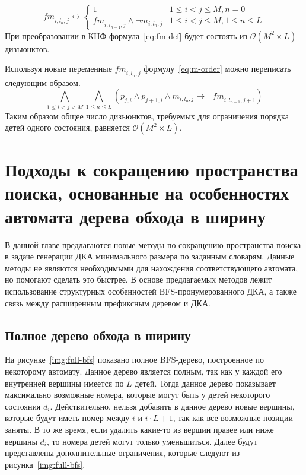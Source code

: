 \begin{equation}
\label{eq:fm-def}
  \mathit{fm}_{i,l_{n},j} \leftrightarrow 
    \begin{cases} 
      1                               & 1 \leq i < j \leq M, n = 0 \\
      \mathit{fm}_{i,l_{n - 1},j} \wedge \neg m_{i,l_{n},j}  & 1 \leq i < j \leq M, 1 \leq n \leq L
    \end{cases} 
\end{equation}
%
При преобразовании в КНФ формула~\eqref{eq:fm-def} будет состоять из $\mathcal{O}\left(M^{2} \times L\right)$ дизъюнктов.

Используя новые переменные $\mathit{fm}_{i,l_{n},j}$ формулу~\eqref{eq:m-order} можно переписать следующим образом.
%
\begin{equation}
\label{eq:m-order-tight}
  \bigwedge_{1 \leq i < j < M} \bigwedge_{1 \leq n \leq L} \left(p_{j,i} \wedge p_{j + 1, i} \wedge m_{i,l_{n}, j} \rightarrow \neg \mathit{fm}_{i, l_{n - 1}, j + 1}\right)
\end{equation}
%
Таким образом общее число дизъюнктов, требуемых для ограничения порядка детей одного состояния, равняется $\mathcal{O}\left(M^{2} \times L\right)$. 


\section{Подходы к сокращению пространства поиска, основанные на особенностях автомата дерева обхода в ширину} 
\label{sec:space:pruning}

В данной главе предлагаются новые методы по сокращению пространства поиска в задаче генерации ДКА минимального размера по заданным словарям. 
Данные методы не являются необходимыми для нахождения соответствующего автомата, но помогают сделать это быстрее.
В основе предлагаемых методов лежит использование структурных особенностей BFS-пронумерованного ДКА, а также связь между расширенным префиксным деревом и ДКА.

\subsection{Полное дерево обхода в ширину}
\label{sec:space:pruning:bfs-tree}

На рисунке~\ref{img:full-bfs} показано полное BFS-дерево, построенное по некоторому автомату.
Данное дерево является полным, так как у каждой его внутренней вершины имеется по $L$ детей.
Тогда данное дерево показывает максимально возможные номера, которые могут быть у детей некоторого состояния $d_{i}$.
Действительно, нельзя добавить в данное дерево новые вершины, которые будут иметь номер между $i$ и $i \cdot L + 1$, так как все возможные позиции заняты.
В то же время, если удалить какие-то из вершин правее или ниже вершины $d_{i}$, то номера детей могут только уменьшиться.
Далее будут представлены дополнительные ограничения, которые следуют из рисунка~\ref{img:full-bfs}.

